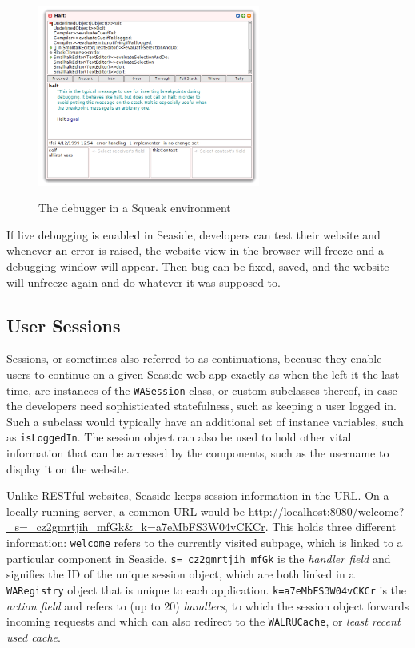 \documentclass[a4paper,12pt,pagesize,headsepline,titlepage]{scrartcl}
\begin{document}
\begin{figure}[h]
\begin{center}
\includegraphics*[width=0.65\textwidth]{images/debugger.png}\\
\caption{The debugger in a Squeak environment}
\label{abb:debug}
\end{center}
\end{figure}

If live debugging is enabled in Seaside, developers can test their website and whenever an error is raised, the website view in the browser will freeze and a debugging window will appear. Then bug can be fixed, saved, and the website will unfreeze again and do whatever it was supposed to.

\subsection{User Sessions}

Sessions, or sometimes also referred to as continuations, because they enable users to continue on a given Seaside web app  exactly as when the left it the last time, are instances of the \texttt{WASession} class, or custom subclasses thereof, in case the developers need sophisticated statefulness, such as keeping a user logged in. Such a subclass would typically have an additional set of instance variables, such as \texttt{isLoggedIn}. The session object can also be used to hold other vital information that can be accessed by the components, such as the username to display it on the website. \cite{ducasse2010dynamic}

Unlike RESTful websites, Seaside keeps session information in the URL. On a locally running server, a common URL would be \url{http://localhost:8080/welcome?_s=_cz2gmrtjih_mfGk&_k=a7eMbFS3W04vCKCr}. This holds three different information: \texttt{welcome} refers to the currently visited subpage, which is linked to a particular component in Seaside. \texttt{s=\_cz2gmrtjih\_mfGk} is the \emph{handler field} and signifies the ID of the unique session object, which are both linked in a \texttt{WARegistry} object that is unique to each application. \texttt{k=a7eMbFS3W04vCKCr} is the \emph{action field} and refers to (up to 20) \emph{handlers}, to which the session object forwards incoming requests and which can also redirect to the \texttt{WALRUCache}, or \emph{least recent used cache}. \cite{perscheid2008introduction}
\end{document}
